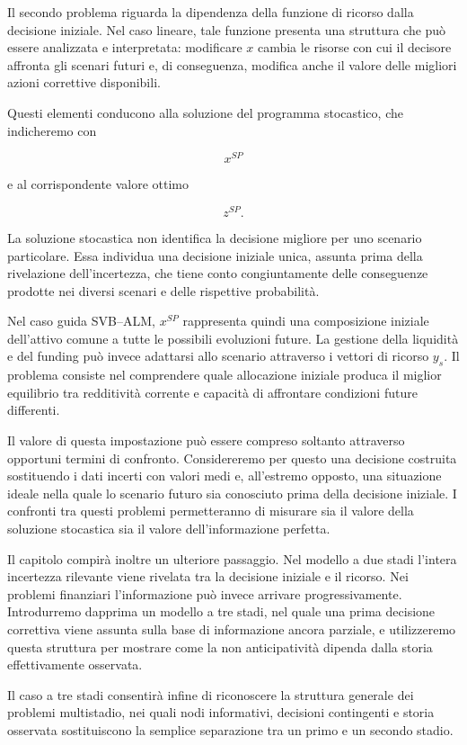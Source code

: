 Il secondo problema riguarda la dipendenza della funzione di ricorso dalla
decisione iniziale. Nel caso lineare, tale funzione presenta una struttura
che pu\`o essere analizzata e interpretata: modificare $x$ cambia le risorse
con cui il decisore affronta gli scenari futuri e, di conseguenza, modifica
anche il valore delle migliori azioni correttive disponibili.

Questi elementi conducono alla soluzione del programma stocastico, che
indicheremo con

\[
x^{SP}
\]

e al corrispondente valore ottimo

\[
z^{SP}.
\]

La soluzione stocastica non identifica la decisione migliore per uno scenario
particolare. Essa individua una decisione iniziale unica, assunta prima della
rivelazione dell'incertezza, che tiene conto congiuntamente delle conseguenze
prodotte nei diversi scenari e delle rispettive probabilit\`a.

Nel caso guida SVB--ALM, $x^{SP}$ rappresenta quindi una composizione iniziale
dell'attivo comune a tutte le possibili evoluzioni future. La gestione della
liquidit\`a e del funding pu\`o invece adattarsi allo scenario attraverso i
vettori di ricorso $y_s$. Il problema consiste nel comprendere quale
allocazione iniziale produca il miglior equilibrio tra redditivit\`a corrente
e capacit\`a di affrontare condizioni future differenti.

Il valore di questa impostazione pu\`o essere compreso soltanto attraverso
opportuni termini di confronto. Considereremo per questo una decisione
costruita sostituendo i dati incerti con valori medi e, all'estremo opposto,
una situazione ideale nella quale lo scenario futuro sia conosciuto prima
della decisione iniziale. I confronti tra questi problemi permetteranno di
misurare sia il valore della soluzione stocastica sia il valore
dell'informazione perfetta.

Il capitolo compir\`a inoltre un ulteriore passaggio. Nel modello a due stadi
l'intera incertezza rilevante viene rivelata tra la decisione iniziale e il ricorso. Nei problemi finanziari l'informazione pu\`o invece arrivare
progressivamente. Introdurremo dapprima un modello a tre stadi, nel quale una
prima decisione correttiva viene assunta sulla base di informazione ancora
parziale, e utilizzeremo questa struttura per mostrare come la
non anticipativit\`a dipenda dalla storia effettivamente osservata.

Il caso a tre stadi consentir\`a infine di riconoscere la struttura generale
dei problemi multistadio, nei quali nodi informativi, decisioni contingenti e
storia osservata sostituiscono la semplice separazione tra un primo e un
secondo stadio.

